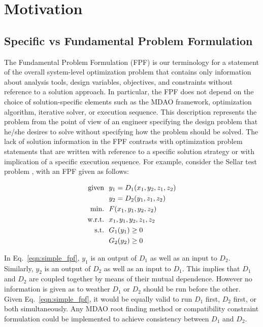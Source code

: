 \section{Motivation}
\subsection{Specific vs Fundamental Problem Formulation }
	\label{s:specific vs fundamental}
    The Fundamental Problem Formulation (FPF) is our terminology for a statement of the overall system-level optimization problem that contains only  information about analysis tools, design variables, objectives, and constraints without reference to a solution approach. 
In particular, the FPF does not depend on the choice of solution-specific elements such as the MDAO framework, optimization algorithm, iterative solver, or execution sequence. 
This description represents  the problem from the point of view of an engineer specifying the design problem that he/she desires to solve without specifying how the problem should be solved. 
The lack of solution information in the FPF contrasts with optimization problem statements that are written with reference to a specific solution strategy or with implication of a specific execution sequence. 
For example, consider the Sellar test problem \cite{AIAA:sellar}, with an FPF given as follows:

    \begin{align}
        \textrm{given} & \ \ y_1 = D_1(x_1,y_2,z_1,z_2) \notag
        \\      & \ \ y_2 = D_2(y_1,z_1,z_2) \notag
        \\\textrm{min.} &\ \ F(x_1,y_1,y_2,z_2) \notag
        \\\textrm{w.r.t.} & \ \ x_1,y_1,y_2,z_1,z_2 \notag
        \\\textrm{s.t.} & \ \ G_1(y_1) \geq 0 \notag
        \\     & \ \ G_2(y_2) \geq 0
        \label{eqn:simple_fpf}
    \end{align}

    
    In Eq.~\ref{eqn:simple_fpf}, $y_1$ is an output of $D_1$ as well as an input 
    to $D_2$. Similarly, $y_2$ is an output of $D_2$ as well as an input 
    to $D_1$. This implies that $D_1$ and $D_2$ are coupled together by means 
    of their mutual dependence. However no information is given as to weather
    $D_1$ or $D_2$ should be run before the other. Given Eq.~\ref{eqn:simple_fpf}, 
    it would be equally valid to run $D_1$ first, $D_2$ first, or both simultaneously. 
Any MDAO root finding method or compatibility constraint formulation could be implemented to achieve consistency between $D_1$ and $D_2$.
    
